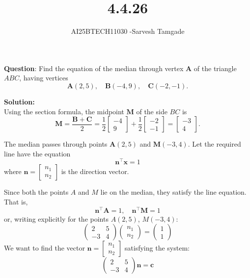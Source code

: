 \documentclass[journal]{IEEEtran}
\begin{document}

\vspace{3cm}

\title{4.4.26}
\author{AI25BTECH11030 -Sarvesh Tamgade}
{\let\newpage\relax\maketitle}

\renewcommand{\thefigure}{\theenumi}
\renewcommand{\thetable}{\theenumi}
\setlength{\intextsep}{10pt} 


\renewcommand{\thetable}{\theenumi}


\textbf{Question}: Find the equation of the median through vertex \(\mathbf{A}\) of the triangle \(ABC\), having vertices
\[
\mathbf{A}(2,5), \quad \mathbf{B}(-4,9), \quad \mathbf{C}(-2,-1).
\]

\textbf{Solution:}\\
Using the section formula, the midpoint \(\mathbf{M}\) of the side \(BC\) is 
\[
\mathbf{M} = \frac{\mathbf{B} + \mathbf{C}}{2} = 
\frac{1}{2} \begin{bmatrix} -4 \\ 9 \end{bmatrix} + 
\frac{1}{2} \begin{bmatrix} -2 \\ -1 \end{bmatrix} = 
\begin{bmatrix} -3 \\ 4 \end{bmatrix}.
\]

The median passes through points \(\mathbf{A}(2,5)\) and \(\mathbf{M}(-3,4)\).
Let the required line have the equation
\[
\mathbf{n}^\top \mathbf{x} = 1
\]
where \( \mathbf{n} = \begin{bmatrix} n_1 \\ n_2 \end{bmatrix} \) is the direction vector.

Since both the points \( A \) and \( M \) lie on the median, they satisfy the line equation. That is,
\[
\mathbf{n}^\top \mathbf{A} = 1, \quad \mathbf{n}^\top \mathbf{M} = 1
\]
or, writing explicitly for the points \( A(2,5) \), \( M(-3,4) \):
\[
\begin{pmatrix}
2 & 5 \\
-3 & 4
\end{pmatrix}
\begin{pmatrix}
n_1 \\ n_2
\end{pmatrix}
=
\begin{pmatrix}
1 \\ 1
\end{pmatrix}
\]
We want to find the vector \( \mathbf{n} = \begin{bmatrix} n_1 \\ n_2 \end{bmatrix} \) satisfying the system:
\[
\begin{pmatrix}
2 & 5 \\
-3 & 4
\end{pmatrix} \mathbf{n} = \mathbf{c}
\]
\end{document}
